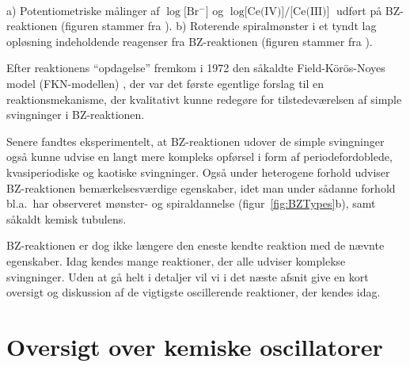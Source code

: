 {
\ \vspace{5cm} \ 
}
{
\caption{\protect\capsize
a) Potentiometriske m{\aa}linger af $\log\mbox{[Br$^-$]}$
og $\log\mbox{[Ce(IV)]/[Ce(III)]}$ udf{\o}rt p{\aa}
BZ-reaktionen (figuren stammer fra \protect\cite{FKNorig}).
b) Roterende spiralm{\o}nster i et tyndt lag opl{\o}sning
indeholdende reagenser fra BZ-reaktionen (figuren
stammer fra \protect\cite{WinfreeSpirals}).}
\label{fig:BZTypes}
}

\vspace{4.0mm}
Efter reaktionens ``opdagelse'' fremkom i 1972
den s{\aa}kaldte Field-K\"{o}r\"{o}s-Noyes model
(FKN-modellen) \cite{FKNorig}, der var det f{\o}rste
egentlige forslag til en reaktions\-mekanisme, der
kvalitativt kunne redeg{\o}re for tilstede\-v{\ae}relsen af
simple sving\-ninger i BZ-reaktionen.

\vspace{4.0mm}
Senere fandtes eksperimentelt, at BZ-reaktionen udover de
simple sving\-ninger ogs{\aa} kunne udvise en langt mere
kompleks opf{\o}rsel i form af periodefordoblede,
kvasiperiodiske og kaotiske sving\-ninger. Ogs{\aa} under
heterogene forhold udviser BZ-reaktionen
bem{\ae}rkelses\-v{\ae}rdige egen\-skaber, idet man under
s{\aa}danne forhold bl.a.\ har observeret m{\o}n\-ster- og
spiraldannelse (figur~\ref{fig:BZTypes}b), samt s{\aa}\-kaldt
kemisk tubulens.

\vspace{4.0mm}
BZ-reaktionen er dog ikke l{\ae}ngere den eneste kendte
reaktion med de n{\ae}vnte egen\-skaber. Idag kendes mange
reaktioner, der alle udviser komplekse sving\-ninger. Uden
at g{\aa} helt i detaljer vil vi i det n{\ae}ste afsnit
give en kort oversigt og diskussion af de vigtigste
oscillerende reaktioner, der kendes idag.

\section{Oversigt over kemiske oscillatorer}
\label{sec:OscOversigt}
